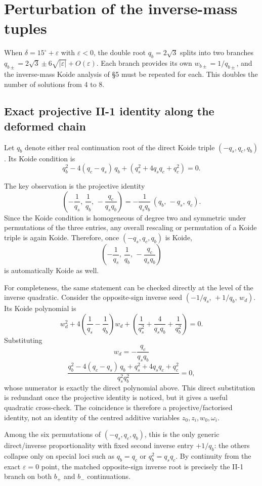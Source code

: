 \documentclass[11pt]{article}
\begin{document}
\section{Perturbation of the inverse-mass tuples}

When $\delta = 15^\circ + \varepsilon$ with $\varepsilon < 0$,
the double root $q_b = 2\sqrt{3}$ splits into two branches
$q_{b\pm} = 2\sqrt{3} \pm 6\sqrt{|\varepsilon|} + O(\varepsilon)$.
Each branch provides its own $w_{b\pm} = 1/q_{b\pm}$, and the
inverse-mass Koide analysis of \S5 must be repeated for each.
This doubles the number of solutions from 4 to 8.

\subsection{Exact projective II-1 identity along the deformed chain}
\label{sec:projective-ii}

Let $q_b$ denote either real continuation root of the direct Koide triple
$(-q_s,q_c,q_b)$.  Its Koide condition is
\[
  q_b^2 - 4(q_c-q_s)\,q_b + (q_s^2 + 4q_s q_c + q_c^2) = 0.
\]

The key observation is the projective identity
\[
  \left(-\frac{1}{q_s},\,\frac{1}{q_b},\,-\frac{q_c}{q_s q_b}\right)
  = -\frac{1}{q_s q_b}\,(q_b,\,-q_s,\,q_c).
\]
Since the Koide condition is homogeneous of degree two and symmetric under
permutations of the three entries, any overall rescaling or permutation of
a Koide triple is again Koide.  Therefore, once $(-q_s,q_c,q_b)$ is Koide,
\[
  \left(-\frac{1}{q_s},\,\frac{1}{q_b},\,-\frac{q_c}{q_s q_b}\right)
\]
is automatically Koide as well.

For completeness, the same statement can be checked directly at the level of
the inverse quadratic.  Consider the opposite-sign inverse seed
$(-1/q_s,\,+1/q_b,\,w_d)$.  Its Koide polynomial is
\[
  w_d^2 + 4\!\left(\frac{1}{q_s}-\frac{1}{q_b}\right) w_d
  + \left(\frac{1}{q_s^2} + \frac{4}{q_s q_b} + \frac{1}{q_b^2}\right)=0.
\]
Substituting
\[
  w_d = -\frac{q_c}{q_s q_b}
\]
\[
  \frac{q_b^2 - 4(q_c-q_s)\,q_b + q_s^2 + 4q_s q_c + q_c^2}{q_s^2 q_b^2}=0,
\]
whose numerator is exactly the direct polynomial above.
This direct substitution is redundant once the projective identity is
noticed, but it gives a useful quadratic cross-check.  The coincidence is
therefore a projective/factorised identity, not an identity of the centred
additive variables $z_0,z_i,w_0,\omega_i$.

Among the six permutations of $(-q_s,q_c,q_b)$, this is the only generic
direct/inverse proportionality with fixed second inverse entry $+1/q_b$:
the others collapse only on special loci such as $q_b=q_c$ or
$q_b^2=q_s q_c$.  By continuity from the exact $\varepsilon=0$ point, the
matched opposite-sign inverse root is precisely the II-1 branch on both
$b_+$ and $b_-$ continuations.
\end{document}
